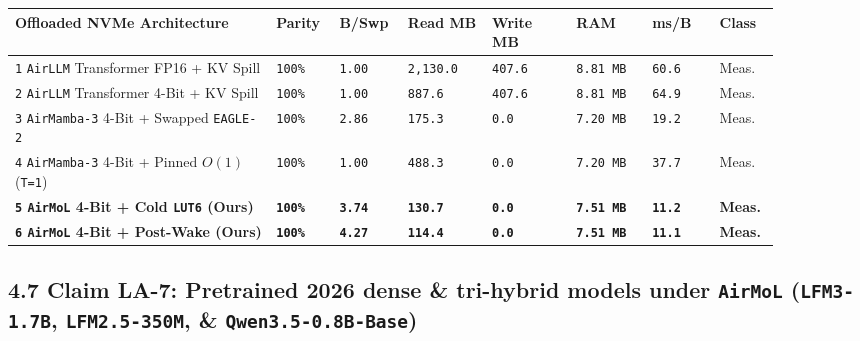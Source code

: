 \documentclass[10pt]{article}
\begin{document}
{\footnotesize\setlength{\tabcolsep}{3pt}
\begin{longtable}{@{}L{0.31\linewidth}C{0.07\linewidth}C{0.07\linewidth}C{0.10\linewidth}C{0.10\linewidth}C{0.09\linewidth}C{0.08\linewidth}L{0.07\linewidth}@{}}
\toprule
\textbf{Offloaded NVMe Architecture} & \textbf{Parity} & \textbf{B/Swp} & \textbf{Read MB} & \textbf{Write MB} & \textbf{RAM} & \textbf{ms/B} & \textbf{Class} \\
\midrule
\endhead
\texttt{1} \texttt{AirLLM} Transformer FP16 + KV Spill & \texttt{100\%} & \texttt{1.00} & \texttt{2,130.0} & \texttt{407.6} & \texttt{8.81 MB} & \texttt{60.6} & Meas. \\
\texttt{2} \texttt{AirLLM} Transformer 4-Bit + KV Spill & \texttt{100\%} & \texttt{1.00} & \texttt{887.6} & \texttt{407.6} & \texttt{8.81 MB} & \texttt{64.9} & Meas. \\
\texttt{3} \texttt{AirMamba-3} 4-Bit + Swapped \texttt{EAGLE-2} & \texttt{100\%} & \texttt{2.86} & \texttt{175.3} & \texttt{0.0} & \texttt{7.20 MB} & \texttt{19.2} & Meas. \\
\texttt{4} \texttt{AirMamba-3} 4-Bit + Pinned $O(1)$ (\texttt{T=1}) & \texttt{100\%} & \texttt{1.00} & \texttt{488.3} & \texttt{0.0} & \texttt{7.20 MB} & \texttt{37.7} & Meas. \\
\textbf{\texttt{5} \texttt{AirMoL} 4-Bit + Cold \texttt{LUT6} (Ours)} & \textbf{\texttt{100\%}} & \textbf{\texttt{3.74}} & \textbf{\texttt{130.7}} & \textbf{\texttt{0.0}} & \textbf{\texttt{7.51 MB}} & \textbf{\texttt{11.2}} & \textbf{Meas.} \\
\textbf{\texttt{6} \texttt{AirMoL} 4-Bit + Post-Wake (Ours)} & \textbf{\texttt{100\%}} & \textbf{\texttt{4.27}} & \textbf{\texttt{114.4}} & \textbf{\texttt{0.0}} & \textbf{\texttt{7.51 MB}} & \textbf{\texttt{11.1}} & \textbf{Meas.} \\
\bottomrule
\end{longtable}
}

\subsection{4.7 Claim LA-7: Pretrained 2026 dense \& tri-hybrid models under \texttt{AirMoL} (\texttt{LFM3-1.7B}, \texttt{LFM2.5-350M}, \& \texttt{Qwen3.5-0.8B-Base})}\label{claim-la7}
\end{document}
